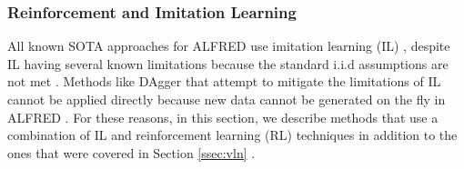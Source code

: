 \documentclass[11pt,a4paper]{article}
\begin{document}
\subsubsection{Reinforcement and Imitation Learning}
\label{ssec:rlil}
All known SOTA approaches \cite{singh2020moca, corona2020modularity, Storks2021AreWT} for ALFRED use imitation learning (IL) \cite{hussein2017imitation}, despite IL having several known limitations because the standard i.i.d assumptions are not met \cite{ross2010efficient}. Methods like DAgger \cite{ross2011reduction} that attempt to mitigate the limitations of IL cannot be applied directly because new data cannot be generated on the fly in ALFRED \cite{shridhar2020alfred}.
For these reasons, in this section, we describe methods that use a combination of IL and reinforcement learning (RL) techniques in addition to the ones that were covered in Section \ref{ssec:vln} \cite{wang2019reinforced, wang2018look}.
\end{document}

